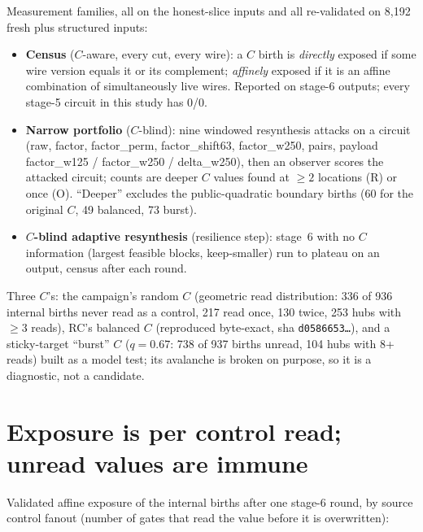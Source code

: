 \documentclass[11pt]{article}
\newcommand{\code}[1]{\texttt{#1}}
\begin{document}
Measurement families, all on the honest-slice inputs and all re-validated on 8,192 fresh plus structured inputs:
\begin{itemize}
\item \textbf{Census} ($C$-aware, every cut, every wire): a $C$ birth is \emph{directly} exposed if some wire version equals it or its complement; \emph{affinely} exposed if it is an affine combination of simultaneously live wires. Reported on stage-6 outputs; every stage-5 circuit in this study has 0/0.
\item \textbf{Narrow portfolio} ($C$-blind): nine windowed resynthesis attacks on a circuit (raw, factor, factor\_perm, factor\_shift63, factor\_w250, pairs, payload factor\_w125 / factor\_w250 / delta\_w250), then an observer scores the attacked circuit; counts are deeper $C$ values found at $\geq 2$ locations (R) or once (O). ``Deeper'' excludes the public-quadratic boundary births (60 for the original $C$, 49 balanced, 73 burst).
\item \textbf{$C$-blind adaptive resynthesis} (resilience step): stage~6 with no $C$ information (largest feasible blocks, keep-smaller) run to plateau on an output, census after each round.
\end{itemize}
Three $C$'s: the campaign's random $C$ (geometric read distribution: 336 of 936 internal births never read as a control, 217 read once, 130 twice, 253 hubs with $\geq 3$ reads), RC's balanced $C$ (reproduced byte-exact, sha \code{d0586653\ldots}), and a sticky-target ``burst'' $C$ ($q=0.67$: 738 of 937 births unread, 104 hubs with 8+ reads) built as a model test; its avalanche is broken on purpose, so it is a diagnostic, not a candidate.

\section{Exposure is per control read; unread values are immune}
Validated affine exposure of the internal births after one stage-6 round, by source control fanout (number of gates that read the value before it is overwritten):

\begin{center}\footnotesize
{}
\end{center}
\end{document}

